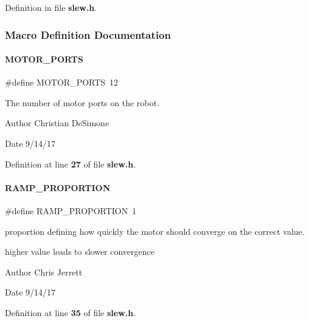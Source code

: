 Definition in file \textbf{ slew.\+h}.



\subsubsection{Macro Definition Documentation}
\mbox{\label{a00065_ad1ad4b29af4180aa00713599367fbc98}} 
\paragraph{M\+O\+T\+O\+R\+\_\+\+P\+O\+R\+TS}
{\footnotesize\ttfamily \#define M\+O\+T\+O\+R\+\_\+\+P\+O\+R\+TS~12}



The number of motor ports on the robot. 

\begin{DoxyAuthor}{Author}
Christian De\+Simone 
\end{DoxyAuthor}
\begin{DoxyDate}{Date}
9/14/17 
\end{DoxyDate}


Definition at line \textbf{ 27} of file \textbf{ slew.\+h}.

\mbox{\label{a00065_a4a3ff8667251227c99f8f4c81e9ff467}} 
\paragraph{R\+A\+M\+P\+\_\+\+P\+R\+O\+P\+O\+R\+T\+I\+ON}
{\footnotesize\ttfamily \#define R\+A\+M\+P\+\_\+\+P\+R\+O\+P\+O\+R\+T\+I\+ON~1}



proportion defining how quickly the motor should converge on the correct value. 

higher value leads to slower convergence \begin{DoxyAuthor}{Author}
Chris Jerrett 
\end{DoxyAuthor}
\begin{DoxyDate}{Date}
9/14/17 
\end{DoxyDate}


Definition at line \textbf{ 35} of file \textbf{ slew.\+h}.

